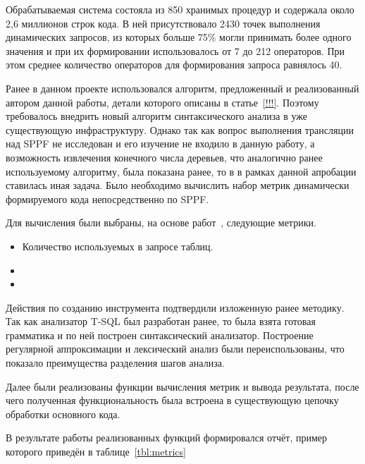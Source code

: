 Обрабатываемая система состояла из 850 хранимых процедур и содержала около 2,6 миллионов строк кода. В ней присутствовало 2430 точек выполнения динамических запросов, из которых больше 75\% могли принимать более одного значения и при их формировании использовалось от 7 до 212 операторов. При этом среднее количество операторов для формирования запроса равнялось 40.

Ранее в данном проекте использовался алгоритм, предложенный и реализованный автором данной работы, детали которого описаны в статье~\ref{!!!}. Поэтому требовалось внедрить новый алгоритм синтаксического анализа в уже существующую инфраструктуру. Однако так как вопрос выполнения трансляции над SPPF не исследован и его изучение не входило в данную работу, а возможность извлечения конечного числа деревьев, что аналогично ранее используемому алгоритму, была показана ранее, то в в рамках данной апробации ставилась иная задача. Было необходимо вычислить набор метрик динамически формируемого кода непосредственно по SPPF. 

Для вычисления были выбраны, на основе работ~\cite{DSQLQualityMesure, DSQLQualityMesureBIG, DevelopmentDSQLTools}, следующие метрики.
\begin{itemize}
    \item Количество используемых в запросе таблиц.
    \item    
    \item 
\end{itemize}

Действия по созданию инструмента подтвердили изложенную ранее методику. Так как анализатор T-SQL был разработан ранее, то была взята готовая грамматика и по ней построен синтаксический анализатор. Построение регулярной аппроксимации и лексический анализ были переиспользованы, что показало преимущества разделения шагов анализа.

Далее были реализованы функции вычисления метрик и вывода результата, после чего полученная функциональность была встроена в существующую цепочку обработки основного кода.

В результате работы реализованных функций формировался отчёт, пример которого приведён в таблице~\ref{tbl:metrics}

